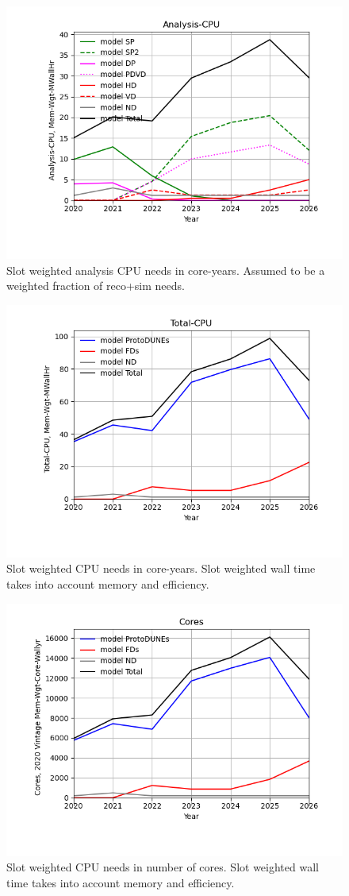 \begin{figure}[h]
\centering\includegraphics[height=0.4\textwidth]{MoreSim_2022-12-02-2026/MoreSim_2022-12-02-2026-Analysis-CPU.png}
\caption{Slot weighted analysis CPU needs in core-years. Assumed to be a weighted fraction of reco+sim needs.}
\label{fig:Analysis-CPU}
\end{figure}
\begin{figure}[h]
\centering\includegraphics[height=0.4\textwidth]{MoreSim_2022-12-02-2026/MoreSim_2022-12-02-2026-Total-CPU.png}
\caption{Slot weighted CPU needs in core-years. Slot weighted wall time takes into account memory and efficiency.}
\label{fig:Total-CPU}
\end{figure}
\begin{figure}[h]
\centering\includegraphics[height=0.4\textwidth]{MoreSim_2022-12-02-2026/MoreSim_2022-12-02-2026-Cores.png}
\caption{Slot weighted CPU needs in number of cores. Slot weighted wall time takes into account memory and efficiency.}
\label{fig:Cores}
\end{figure}

